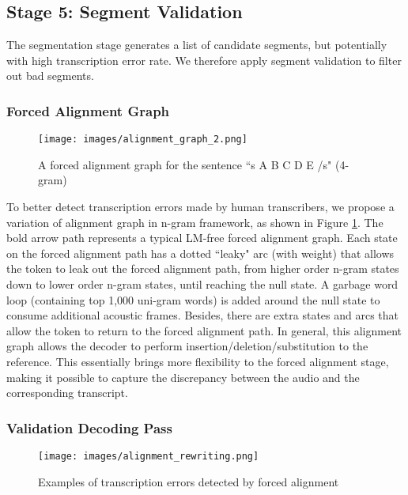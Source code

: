 \documentclass[a4paper]{article}
\begin{document}
\subsection{Stage 5: Segment Validation}
The segmentation stage generates a list of candidate segments, but potentially
with high transcription error rate. We therefore apply segment validation to
filter out bad segments.

\subsubsection{Forced Alignment Graph}
\begin{figure}[t]
  \centering
  \texttt{[image: images/alignment\_graph\_2.png]}
  \vspace{-5ex}
  \caption{A forced alignment graph for the sentence ``s A B C D E /s" (4-gram)}
  \label{fig:alignment_graph}
  \vspace{-2ex}
\end{figure}

To better detect transcription errors made by human transcribers, we propose a
variation of alignment graph in n-gram framework, as shown in Figure \ref{fig:alignment_graph}.
The bold arrow path represents a typical LM-free forced alignment graph.
Each state on the forced alignment path has a dotted ``leaky" arc (with weight) that allows
the token to leak out the forced alignment path, from higher order n-gram states
down to lower order n-gram states, until reaching the null state. A garbage word
loop (containing top 1,000 uni-gram words) is added around the null state to consume
additional acoustic frames. Besides, there are extra states and arcs that allow the token
to return to the forced alignment path. In general, this alignment graph allows
the decoder to perform insertion/deletion/substitution to the reference. This essentially brings more flexibility to the forced alignment stage, making it possible to capture the discrepancy between the audio and the corresponding transcript.

\subsubsection{Validation Decoding Pass}
\begin{figure*}[t]
  \centering
  \vspace{-2ex}
  \texttt{[image: images/alignment\_rewriting.png]}
  \vspace{-4ex}
  \caption{Examples of transcription errors detected by forced alignment}
  \vspace{-2ex}
  \label{fig:alignment_rewriting}
\end{figure*}
\end{document}
